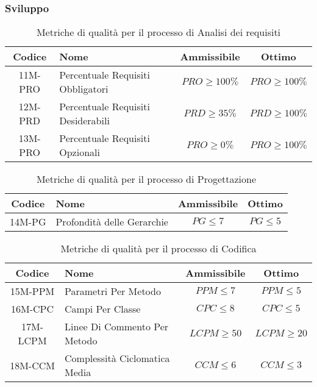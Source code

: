 \newpage
\subsubsection{Sviluppo}
\begin{table}[h!]
	\centering
	\begin{tabular}{ | c | l | c | c | }
		\hline
		Codice   & Nome                               & Ammissibile      & Ottimo           \\
		\hline
		11M-PRO  & Percentuale Requisiti Obbligatori  & $PRO \geq 100\%$ & $PRO \geq 100\%$ \\
		12M-PRD  & Percentuale Requisiti Desiderabili & $PRD \geq 35\%$  & $PRD \geq 100\%$ \\
		13M-PRO  & Percentuale Requisiti Opzionali    & $PRO \geq 0\%$   & $PRO \geq 100\%$ \\
		\hline
	\end{tabular}
	\caption{Metriche di qualità per il processo di Analisi dei requisiti}
\end{table}

\begin{table}[h!]
	\centering
	\begin{tabular}{ | c | l | c | c | }
		\hline
		Codice   & Nome                       & Ammissibile & Ottimo           \\
		\hline
		14M-PG   & Profondità delle Gerarchie & $PG \leq 7$ & $PG \leq 5$      \\
		\hline
	\end{tabular}
	\caption{Metriche di qualità per il processo di Progettazione}
\end{table}

\begin{table}[h!]
	\centering
	\begin{tabular}{ | c | l | c | c | }
		\hline
		Codice   & Nome                          & Ammissibile    & Ottimo         \\
		\hline
		15M-PPM  & Parametri Per Metodo          & $PPM \leq 7$   & $PPM \leq 5$   \\
		16M-CPC  & Campi Per Classe 	         & $CPC \leq 8$   & $CPC \leq 5$   \\
		17M-LCPM & Linee Di Commento Per Metodo  & $LCPM \geq 50$ & $LCPM \geq 20$ \\
		18M-CCM  & Complessità Ciclomatica Media & $CCM \leq 6$   & $CCM \leq 3$   \\
		\hline
	\end{tabular}
	\caption{Metriche di qualità per il processo di Codifica}
\end{table}

